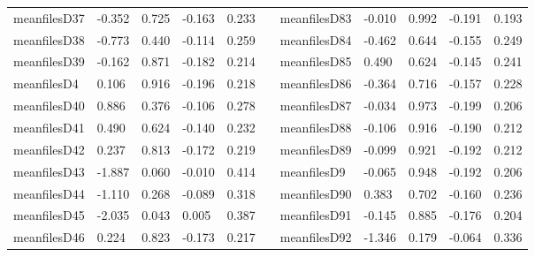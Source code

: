\begin{table}[h!]
\begin{tabular}{lllllllllll}
meanfilesD37  & -0.352           & 0.725            & -0.163              & 0.233               &           & meanfilesD83  & -0.010           & 0.992            & -0.191              & 0.193               \\
meanfilesD38  & -0.773           & 0.440            & -0.114              & 0.259               &           & meanfilesD84  & -0.462           & 0.644            & -0.155              & 0.249               \\
meanfilesD39  & -0.162           & 0.871            & -0.182              & 0.214               &           & meanfilesD85  & 0.490            & 0.624            & -0.145              & 0.241               \\
meanfilesD4   & 0.106            & 0.916            & -0.196              & 0.218               &           & meanfilesD86  & -0.364           & 0.716            & -0.157              & 0.228               \\
meanfilesD40  & 0.886            & 0.376            & -0.106              & 0.278               &           & meanfilesD87  & -0.034           & 0.973            & -0.199              & 0.206               \\
meanfilesD41  & 0.490            & 0.624            & -0.140              & 0.232               &           & meanfilesD88  & -0.106           & 0.916            & -0.190              & 0.212               \\
meanfilesD42  & 0.237            & 0.813            & -0.172              & 0.219               &           & meanfilesD89  & -0.099           & 0.921            & -0.192              & 0.212               \\
meanfilesD43  & -1.887           & 0.060            & -0.010              & 0.414               &           & meanfilesD9   & -0.065           & 0.948            & -0.192              & 0.206               \\
meanfilesD44  & -1.110           & 0.268            & -0.089              & 0.318               &           & meanfilesD90  & 0.383            & 0.702            & -0.160              & 0.236               \\
meanfilesD45  & -2.035           & 0.043            & 0.005               & 0.387               &           & meanfilesD91  & -0.145           & 0.885            & -0.176              & 0.204               \\
meanfilesD46  & 0.224            & 0.823            & -0.173              & 0.217               &           & meanfilesD92  & -1.346           & 0.179            & -0.064              & 0.336               \\

\end{tabular}
\end{table}

